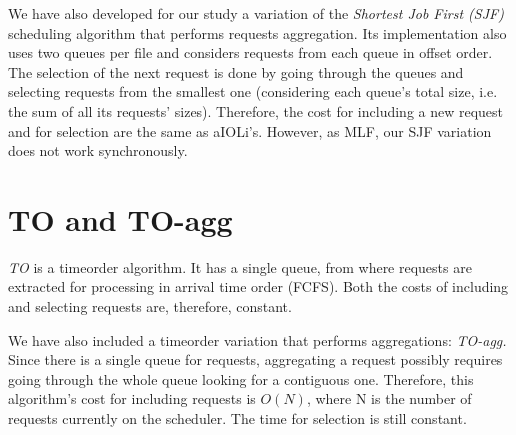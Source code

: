 We have also developed for our study a variation of the \emph{Shortest Job First (SJF)} scheduling algorithm that performs requests aggregation. Its implementation also uses two queues per file and considers requests from each queue in offset order. The selection of the next request is done by going through the queues and selecting requests from the smallest one (considering each queue's total size, i.e. the sum of all its requests' sizes).
%
Therefore, the cost for including a new request and for selection are the same as aIOLi's. However, as MLF, our SJF variation does not work synchronously.

\section{TO and TO-agg}

\emph{TO} is a timeorder algorithm. It has a single queue, from where requests are extracted for processing in arrival time order (FCFS). Both the costs of including and selecting requests are, therefore, constant. 

We have also included a timeorder variation that performs aggregations: \emph{TO-agg.} Since there is a single queue for requests, aggregating a request possibly requires going through the whole queue looking for a contiguous one. Therefore, this algorithm's cost for including requests is $O( N )$, where N is the number of requests currently on the scheduler. The time for selection is still constant. 


